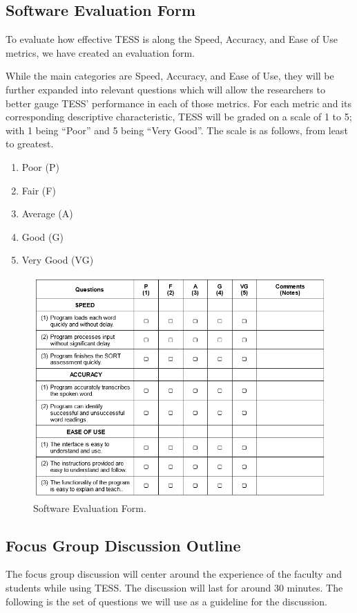 \subsection{Software Evaluation Form}
To evaluate how effective TESS is along the Speed, Accuracy, and Ease of Use metrics, we have created an evaluation form.

While the main categories are Speed, Accuracy, and Ease of Use, they will be further expanded into relevant questions which will allow the researchers to better gauge TESS’ performance in each of those metrics.
{\clearpage}
For each metric and its corresponding descriptive characteristic, TESS will be graded on a scale of 1 to 5; with 1 being “Poor” and 5 being “Very Good”. The scale is as follows, from least to greatest.
\begin{enumerate}
    \item Poor (P)
    \item Fair (F)
    \item Average (A)
    \item Good (G)
    \item Very Good (VG)
\end{enumerate}

\begin{figure}[h]
   \centering
   \includegraphics[scale=0.6]{figures/TESS-software-eval.png}
   \caption{Software Evaluation Form.}
    \label{fig:softwareEval}
\end{figure}


\subsection{Focus Group Discussion Outline}
The focus group discussion will center around the experience of the faculty and students while using TESS. The discussion will last for around 30 minutes. The following is the set of questions we will use as a guideline for the discussion. 

